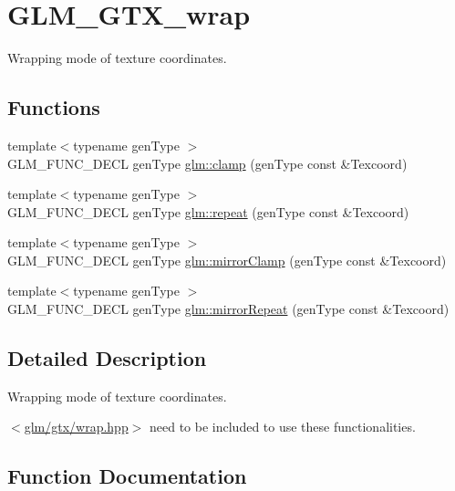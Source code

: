 \hypertarget{group__gtx__wrap}{}\section{G\+L\+M\+\_\+\+G\+T\+X\+\_\+wrap}
\label{group__gtx__wrap}


Wrapping mode of texture coordinates.  


\subsection*{Functions}
\begin{DoxyCompactItemize}
\item 
{\footnotesize template$<$typename gen\+Type $>$ }\\G\+L\+M\+\_\+\+F\+U\+N\+C\+\_\+\+D\+E\+C\+L gen\+Type \hyperlink{group__gtx__wrap_ga6c0cc6bd1d67ea1008d2592e998bad33}{glm\+::clamp} (gen\+Type const \&Texcoord)
\item 
{\footnotesize template$<$typename gen\+Type $>$ }\\G\+L\+M\+\_\+\+F\+U\+N\+C\+\_\+\+D\+E\+C\+L gen\+Type \hyperlink{group__gtx__wrap_ga809650c6310ea7c42666e918c117fb6f}{glm\+::repeat} (gen\+Type const \&Texcoord)
\item 
{\footnotesize template$<$typename gen\+Type $>$ }\\G\+L\+M\+\_\+\+F\+U\+N\+C\+\_\+\+D\+E\+C\+L gen\+Type \hyperlink{group__gtx__wrap_gaa6856a0a048d2749252848da35e10c8b}{glm\+::mirror\+Clamp} (gen\+Type const \&Texcoord)
\item 
{\footnotesize template$<$typename gen\+Type $>$ }\\G\+L\+M\+\_\+\+F\+U\+N\+C\+\_\+\+D\+E\+C\+L gen\+Type \hyperlink{group__gtx__wrap_ga16a89b0661b60d5bea85137bbae74d73}{glm\+::mirror\+Repeat} (gen\+Type const \&Texcoord)
\end{DoxyCompactItemize}


\subsection{Detailed Description}
Wrapping mode of texture coordinates. 

$<$\hyperlink{wrap_8hpp}{glm/gtx/wrap.\+hpp}$>$ need to be included to use these functionalities. 

\subsection{Function Documentation}
\hypertarget{group__gtx__wrap_ga6c0cc6bd1d67ea1008d2592e998bad33}{}
